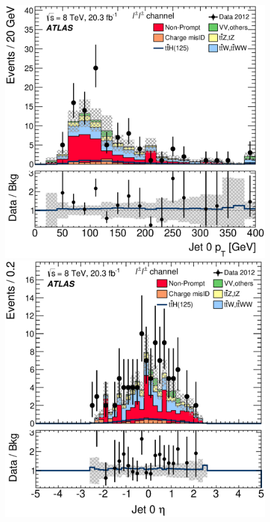 \begin{figure}[!htbp]
\begin{minipage}[h]{0.4\textwidth}
  \end{minipage}\hfill
  \begin{minipage}[h]{0.4\textwidth}
    \centering \includegraphics[width=\textwidth]{figs/results/results_new/2lep_SR_jet00_Pt}
  \end{minipage}\hfill
  \begin{minipage}[h]{0.4\textwidth}
    \centering \includegraphics[width=\textwidth]{figs/results/results_new/2lep_SR_jet00_Eta}

\end{minipage}
\end{figure}
